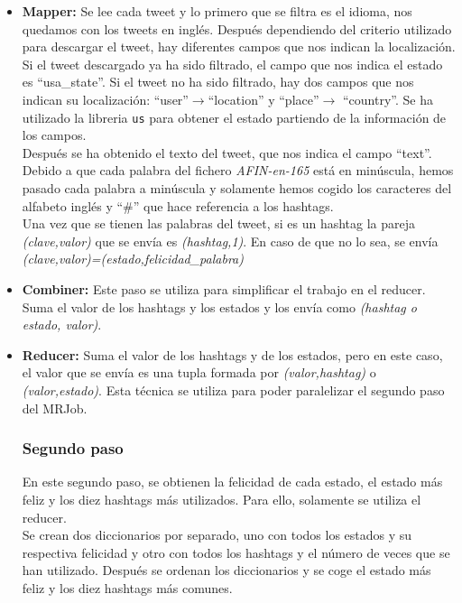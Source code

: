 \documentclass[12pt,a4paper]{article}
\begin{document}
\begin{itemize}
\item \textbf{Mapper:} Se lee cada tweet y lo primero que se filtra es el idioma, nos quedamos con los tweets en inglés. Después dependiendo del criterio utilizado para descargar el tweet, hay diferentes campos que nos indican la localización. Si el tweet descargado ya ha sido filtrado, el campo que nos indica el estado es ``usa\_state''. Si el tweet no ha sido filtrado, hay dos campos que nos indican su localización: ``user''$\rightarrow$``location'' y ``place''$\rightarrow$ ``country''. Se ha utilizado la libreria \texttt{us} para obtener el estado partiendo de la información de los campos.\\

Después se ha obtenido el texto del tweet, que nos indica el campo ``text''. Debido a que cada palabra del fichero \textit{AFIN-en-165} está en minúscula, hemos pasado cada palabra a minúscula y solamente hemos cogido los caracteres del alfabeto inglés y ``\#'' que hace referencia a los hashtags.\\

Una vez que se tienen las palabras del tweet, si es un hashtag la pareja \textit{(clave,valor)} que se envía es \textit{(hashtag,1)}. En caso de que no lo sea, se envía \textit{(clave,valor)=(estado,felicidad\_palabra)} 

\item \textbf{Combiner:} Este paso se utiliza para simplificar el trabajo en el reducer. Suma el valor de los hashtags y los estados y los envía como \textit{(hashtag o estado, valor)}.

\item \textbf{Reducer:} Suma el valor de los hashtags y de los estados, pero en este caso, el valor que se envía es una tupla formada por \textit{(valor,hashtag)} o \textit{(valor,estado)}. Esta técnica se utiliza para poder paralelizar el segundo paso del MRJob.

\subsubsection{Segundo paso}

En este segundo paso, se obtienen  la felicidad de cada estado, el estado más feliz y los diez hashtags más utilizados. Para ello, solamente se utiliza el reducer.\\

Se crean dos diccionarios por separado, uno con todos los estados y su respectiva felicidad y otro con todos los hashtags y el número de veces que se han utilizado. Después se ordenan los diccionarios y se coge el estado más feliz y los diez hashtags más comunes.
\end{itemize}
\end{document}
